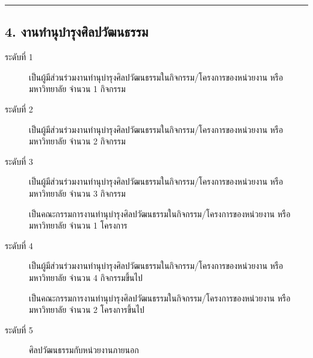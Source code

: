 \documentclass[a4paper,12pt,english]{sphinxmanual}
\begin{document}
\bigskip\hrule\bigskip



\subsection{4. งานทำนุบำรุงศิลปวัฒนธรรม}
\label{\detokenize{submission_part1:id16}}\begin{description}
\item[{ระดับที่ 1}] \leavevmode
เป็นผู้มีส่วนร่วมงานทำนุบำรุงศิลปวัฒนธรรมในกิจกรรม/โครงการของหน่วยงาน หรือมหาวิทยาลัย จำนวน 1 กิจกรรม

\item[{ระดับที่ 2}] \leavevmode
เป็นผู้มีส่วนร่วมงานทำนุบำรุงศิลปวัฒนธรรมในกิจกรรม/โครงการของหน่วยงาน หรือมหาวิทยาลัย จำนวน 2 กิจกรรม

\item[{ระดับที่ 3}] \leavevmode
เป็นผู้มีส่วนร่วมงานทำนุบำรุงศิลปวัฒนธรรมในกิจกรรม/โครงการของหน่วยงาน หรือมหาวิทยาลัย จำนวน 3 กิจกรรม

 เป็นคณะกรรมการงานทำนุบำรุงศิลปวัฒนธรรมในกิจกรรม/โครงการของหน่วยงาน หรือมหาวิทยาลัย จำนวน 1 โครงการ

\item[{ระดับที่ 4}] \leavevmode
เป็นผู้มีส่วนร่วมงานทำนุบำรุงศิลปวัฒนธรรมในกิจกรรม/โครงการของหน่วยงาน หรือมหาวิทยาลัย จำนวน 4 กิจกรรมขึ้นไป

 เป็นคณะกรรมการงานทำนุบำรุงศิลปวัฒนธรรมในกิจกรรม/โครงการของหน่วยงาน หรือมหาวิทยาลัย จำนวน 2 โครงการขึ้นไป

\item[{ระดับที่ 5}] \leavevmode
{\hyperref[\detokenize{glossary:term-11}]{}} ศิลปวัฒนธรรมกับหน่วยงานภายนอก

\end{description}
\end{document}
